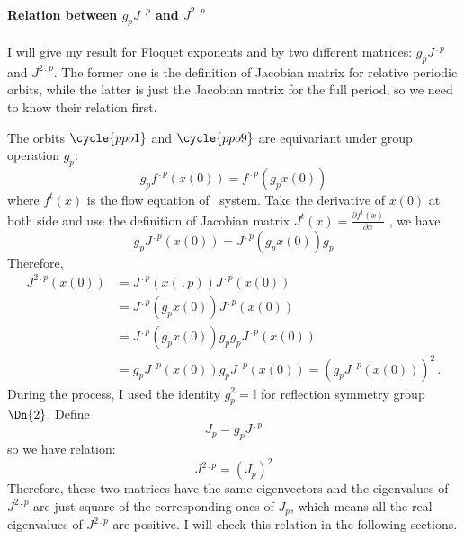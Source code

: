 	\paragraph{Relation between $g_{p}J^{\period{p}}$ and $J^{2\period{p}}$}
		I will give my result for Floquet exponents and
		{\cLvs} by two different matrices: $g_{p}J^{\period{p}}$ and
		$J^{2\period{p}}$. The former one is the definition of Jacobian matrix for
		relative periodic orbits, while the latter is just the Jacobian matrix for
		the full period, so we need to know their relation first.
		
		The orbits $\cycle{ppo1}$ and $\cycle{ppo9}$ are equivariant under group operation
		$g_{p}$:
		\[
		g_{p}f^{\period{p}}(x(0))=f^{\period{p}}(g_{p}x(0))
		\]
		where $f^{t}(x)$ is the flow equation of \KS\ system. Take the derivative of $x(0)$
		at both side and use the definition of Jacobian matrix
		$J^{t}(x)=\frac{\partial f^{t}(x)}{\partial x}$ , we have
		\[
		g_{p}J^{\period{p}}(x(0))=J^{\period{p}}(g_{p}x(0))g_{p}
		\]
		Therefore,
		\begin{align*}
			 J^{2\period{p}}(x(0)) & =J^{\period{p}}(x(\period{p}))J^{\period{p}}(x(0))	\\	
			& =J^{\period{p}}(g_{p}x(0))J^{\period{p}}(x(0))\\
			& =J^{\period{p}}(g_{p}x(0))g_{p}g_{p}J^{\period{p}}(x(0))\\
			& =g_{p}J^{\period{p}}(x(0))g_{p}J^{\period{p}}(x(0))
			  =(g_{p}J^{\period{p}}(x(0)))^{2}\,.
		\end{align*}
		During the process, I used the identity $g_{p}^{2}=\mathbb{I}$
        for reflection symmetry group $\Dn{2}$. Define
		\begin{equation}
		J_{p}=g_{p}J^{\period{p}}
		\label{eq:relative_jacobian}
		\end{equation}
		so we have relation:
		\begin{equation}
			J^{2\period{p}}=(J_{p})^{2}
		\label{eq:relationofjpj2t}
		\end{equation}
		Therefore, these two matrices have the same eigenvectors and the
eigenvalues of $J^{2\period{p}}$ are just square of the
corresponding ones of $J_{p}$, which means all the real eigenvalues of
$J^{2\period{p}}$ are positive. I will check this relation in the
following sections.
		
